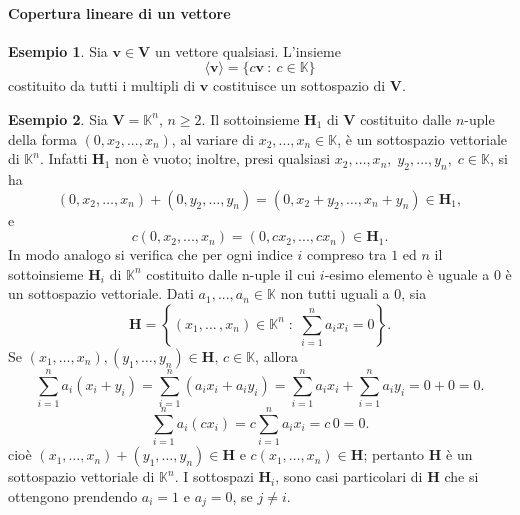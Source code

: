 \documentclass{article}
\theoremstyle{plain}
\theoremstyle{definition}
\newtheorem{exmp}{Esempio}[section]
\theoremstyle{remark}
\begin{document}
\vspace{10pt}

\paragraph{Copertura lineare di un vettore}
\begin{exmp}
    Sia \( \mathbf{v} \in \mathbf{V} \) un vettore qualsiasi. L'insieme
    \[
        \langle \mathbf{v} \rangle = \{ c\mathbf{v}\ :\ c \in \mathbb{K} \}
    \]
    costituito da tutti i multipli di \( \mathbf{v} \) costituisce un sottospazio di \( \mathbf{V} \).
\end{exmp}

\vspace{10pt}

\begin{exmp}\label{exmp:dariprendere}
    Sia \( \mathbf{V} = \mathbb{K}^n \), \( n \geq 2 \).
    Il sottoinsieme \( \mathbf{H}_1 \) di \( \mathbf{V} \) costituito dalle $n$-uple della forma \( (0, x_2, ..., x_n) \), al variare di \( x_2, ..., x_n \in \mathbb{K} \), è un sottospazio vettoriale di \( \mathbb{K}^n \).
    Infatti \( \mathbf{H}_1 \) non è vuoto; inoltre, presi qualsiasi \( x_2,\ldots,x_n,\;y_2,\ldots,y_n,\;c\in \mathbb{K} \), si ha
    \[
        (0, x_2, \ldots, x_n) + (0, y_2, \ldots, y_n) = (0, x_2 + y_2, \ldots, x_n + y_n) \in \mathbf{H}_1,
    \]
    e
    \[
        c(0, x_2, ..., x_n) = (0, c x_2, ..., c x_n) \in \mathbf{H}_1.
    \]
    In modo analogo si verifica che per ogni indice \( i \) compreso tra \( 1 \) ed \( n \) il sottoinsieme \( \mathbf{H}_i \) di \( \mathbb{K}^n \) costituito dalle n-uple il cui \( i \)-esimo elemento è uguale a \( 0 \) è un sottospazio vettoriale.
    Dati \( a_1, ..., a_n \in \mathbb{K} \) non tutti uguali a \( 0 \), sia
    \[
        \mathbf{H} = \left\{ (x_1, ...\, , x_n) \in \mathbb{K}^n\; :\; \sum_{i=1}^{n}a_ix_i = 0 \right\}.
    \]
    Se \((x_1, \ldots, x_n), (y_1, \ldots, y_n) \in \mathbf{H},\,c\in \mathbb{K}\), allora
    \[
        \sum_{i=1}^{n}a_i(x_i+y_i)=\sum_{i=1}^{n}(a_ix_i+a_iy_i)=\sum_{i=1}^{n}a_ix_i+\sum_{i=1}^{n}a_iy_i=0+0=0.
    \]
    \[
        \sum_{i=1}^{n}a_i(c x_i)=c\sum_{i=1}^{n}a_ix_i=c\,0=0.
    \]
    cioè \((x_1,\ldots,x_n)+(y_1,\ldots,y_n)\in \mathbf{H}\) e \(c(x_1,\ldots,x_n)\in \mathbf{H}\); pertanto \(\mathbf{H}\) è un sottospazio vettoriale di \(\mathbb{K}^n\).
    I sottospazi \(\mathbf{H}_i\), sono casi particolari di \(\mathbf{H}\) che si ottengono prendendo \(a_i = 1\) e \(a_j = 0\), se \(j \neq i\).\\
\end{exmp}
\end{document}
